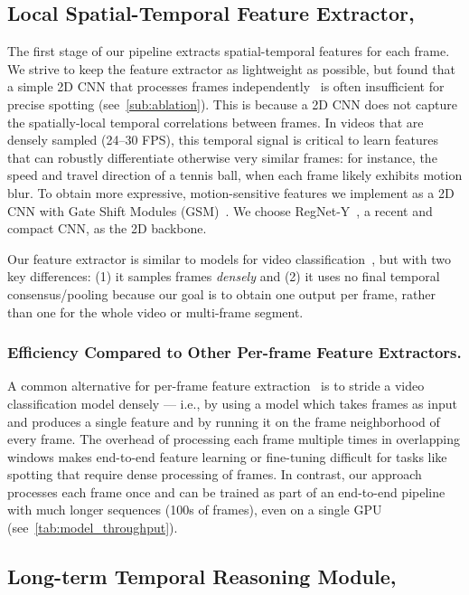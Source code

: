 \documentclass[runningheads]{llncs}
\begin{document}
\subsection{Local Spatial-Temporal Feature Extractor, }
\label{sub:st_features}
The first stage of our pipeline extracts spatial-temporal features for each frame.
We strive to keep the feature extractor as lightweight as possible, but found
that a simple 2D CNN that processes frames
independently~\cite{calf,netvladpp,rmsnet,tsn} is often insufficient for precise
spotting (see~\autoref{sub:ablation}).
This is because a 2D CNN does not capture the spatially-local temporal correlations between frames.
In videos that are densely sampled (24--30 FPS), this temporal signal is
critical to learn features that can robustly differentiate otherwise very
similar frames:
for instance, the speed and travel direction of a tennis ball, when each frame
likely exhibits motion blur.
To obtain more expressive, motion-sensitive features we implement
 as a 2D CNN with Gate Shift Modules (GSM)~\cite{gsm}.
We choose RegNet-Y~\cite{regnet}, a recent and compact CNN, as the 2D backbone.

Our feature extractor is similar to models for
video classification~\cite{tsm,gsm,tsn}, but with two key differences:
(1) it samples frames \emph{densely} and
(2) it uses no final temporal consensus/pooling because our goal is to obtain one output per frame, rather than one for the whole video or multi-frame segment.

\subsubsection*{Efficiency Compared to Other Per-frame Feature Extractors.}
A common alternative for per-frame feature extraction~\cite{tsp,mstcn} is to stride a video classification model densely --- i.e., by using a model which takes  frames as input and produces a single feature and by running it on the  frame neighborhood of every frame.
The overhead of processing each frame multiple
times in overlapping windows makes end-to-end feature learning or fine-tuning difficult for tasks like spotting that require dense processing of frames.
In contrast, our approach processes each frame once and can be trained as part of an end-to-end pipeline with much longer sequences (100s of frames), even on a single GPU (see~\autoref{tab:model_throughput}).

\subsection{Long-term Temporal Reasoning Module, }\label{sub:longterm_reasoning}
\end{document}
